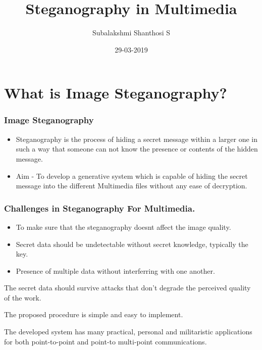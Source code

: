 \documentclass{beamer} %
\title{Steganography in Multimedia}
\author{Subalakshmi Shanthosi S}
\institute{SSN College of Engineering}
\date{}
\date[short date]{29-03-2019}
\theoremstyle{definition} %
\begin{document}
\begin{frame} 
\titlepage
\end{frame}

\section{What is Image Steganography?} %

\begin{frame} 
\frametitle{Image Steganography}
 \begin{itemize}
 \item{Steganography is the process of hiding a secret message within a
 larger one in such a way that someone can not know the presence or contents of the hidden message. }
\end{itemize}
\begin{itemize}
 \item{Aim - To develop a generative system which is capable of hiding the secret message into the different Multimedia files without any ease of decryption.}
\end{itemize}

\end{frame}

\begin{frame}
\frametitle{Challenges in Steganography For Multimedia.}
 \begin{itemize}
	\item{To make sure that the steganography doesnt affect the image quality.}
\end{itemize}
\begin{itemize}
	\item{ Secret data should be undetectable without secret
		knowledge, typically the key.}
\end{itemize}
\begin{itemize}
	\item {Presence of multiple data without interferring with one another.}
\end{itemize}
\begin{itemize}
	\item{The secret data should survive attacks that don’t
		degrade the perceived quality of the work.}
   \item{The proposed procedure is simple and easy to implement.
   	\item The developed system has many practical, personal and
   	militaristic applications for both point-to-point and point-to multi-point communications. }
\end{itemize}
\end{frame}
\end{document}
